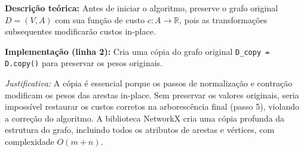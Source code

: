 \begin{tcolorbox}[
        enhanced, breakable,
        colframe=green!60!black, colback=green!5,
        colbacktitle=green!20, coltitle=black,
        title={Passo 1: Cópia do grafo original},
        boxed title style={sharp corners, boxrule=0.6pt},
        sharp corners, boxrule=0.6pt
    ]
    \textbf{Descrição teórica:} Antes de iniciar o algoritmo, preserve o grafo original \(D=(V,A)\) com sua função de custo \(c:A\to\mathbb{R}\), pois as transformações subsequentes modificarão custos in-place.

    \tcblower

    \textbf{Implementação (linha 2):} Cria uma cópia do grafo original \texttt{D\_copy = D.copy()} para preservar os pesos originais.

    \emph{Justificativa:} A cópia é essencial porque os passos de normalização e contração modificam os pesos das arestas in-place. Sem preservar os valores originais, seria impossível restaurar os custos corretos na arborescência final (passo 5), violando a correção do algoritmo. A biblioteca NetworkX cria uma cópia profunda da estrutura do grafo, incluindo todos os atributos de arestas e vértices, com complexidade \(O(m+n)\).
\end{tcolorbox}

